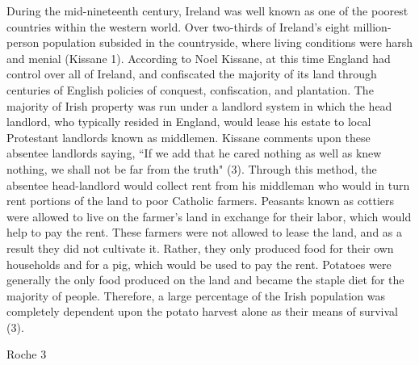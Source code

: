 \begin{Spacing}{1.5}
\hspace{.4in}During the mid-nineteenth century, Ireland was well known as one of the poorest countries within the western world. Over two-thirds of Ireland’s eight million-person population subsided in the countryside, where living conditions were harsh and menial (Kissane 1). According to Noel Kissane, at this time England had control over all of Ireland, and confiscated the majority of its land through centuries of English policies of conquest, confiscation, and plantation. The majority of Irish property was run under a landlord system in which the head landlord, who typically resided in England, would lease his estate to local Protestant landlords known as middlemen. Kissane comments upon these absentee landlords saying, “If we add that he cared nothing as well as knew nothing, we shall not be far from the truth" (3). Through this method, the absentee head-landlord would collect rent from his middleman who would in turn rent portions of the land to poor Catholic farmers. Peasants known as cottiers were allowed to live on the farmer’s land in exchange for their labor, which would help to pay the rent. These farmers were not allowed to lease the land, and as a result they did not cultivate it. Rather, they only produced food for their own households and for a pig, which would be used to pay the rent. Potatoes were generally the only food produced on the land and became the staple diet for the majority of people. Therefore, a large percentage of the Irish population was completely dependent upon the potato harvest alone as their means of survival (3).
\newpage
\thispagestyle{empty}
\begin{flushright}Roche 3\end{flushright}


\end{Spacing}
